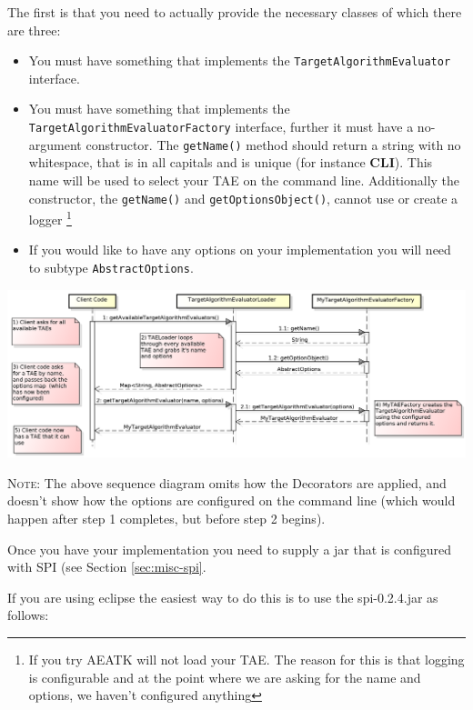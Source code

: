 \documentclass[11pt,letterpaper,oneside]{article}
\begin{document}
The first is that you need to actually provide the necessary classes of which there are three:

\begin{itemize}
\item You must have something that implements the \texttt{TargetAlgorithmEvaluator} interface.
\item You must have something that implements the \texttt{TargetAlgorithmEvaluatorFactory} interface, further it must have a no-argument constructor. The \texttt{getName()} method should return a string with no whitespace, that is in all capitals and is unique (for instance \textbf{CLI}). This name will be used to select your TAE on the command line. Additionally the constructor, the \texttt{getName()} and \texttt{getOptionsObject()}, cannot use or create a logger \footnote{If you try AEATK will not load your TAE. The reason for this is that logging is configurable and at the point where we are asking for the name and options, we haven't configured anything}

\item If you would like to have any options on your implementation you will need to subtype \texttt{AbstractOptions}.
\end{itemize}


\begin{center}
\includegraphics[scale=0.50]{img/UML/TAEConstruction.png}
\end{center}

\textsc{Note:} The above sequence diagram omits how the Decorators are applied, and doesn't show how the options are configured on the command line (which would happen after step 1 completes, but before step 2 begins).





Once you have your implementation you need to supply a jar that is configured with SPI (see Section \ref{sec:misc-spi}. 

If you are using eclipse the easiest way to do this is to use the spi-0.2.4.jar as follows:
\end{document}
